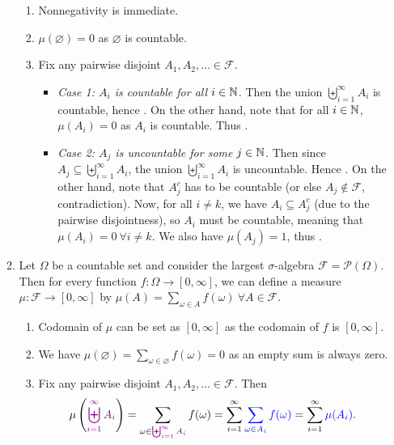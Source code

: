 \begin{enumerate}
\begin{enumerate}
\begin{pf}
\begin{enumerate}[label={(\arabic*)}]
\item Nonnegativity is immediate.
\item \(\mu(\varnothing)=0\) as \(\varnothing\) is countable.
\item Fix any pairwise disjoint \(A_1,A_2,\dotsc\in\mathcal{F}\).
\begin{itemize}
\item \emph{Case 1: \(A_i\) is countable for all \(i\in\mathbb{N}\).} Then the union
\(\biguplus_{i=1}^{\infty}A_i\) is countable, hence
. On the other hand, note that for all
\(i\in\mathbb{N}\), \(\mu(A_i)=0\) as \(A_i\) is countable. Thus
.
\item \emph{Case 2: \(A_j\) is uncountable for some \(j\in\mathbb{N}\).} Then since
\(A_j\subseteq \biguplus_{i=1}^{\infty}A_i\), the union
\(\biguplus_{i=1}^{\infty}A_i\) is uncountable. Hence
. On the other hand, note that \(A_j^c\)
has to be countable (or else \(A_j\notin\mathcal{F}\), contradiction). Now, for
all \(i\ne k\), we have \(A_i\subseteq A_j^c\) (due to the pairwise
disjointness), so \(A_i\) must be countable, meaning that \(\mu(A_i)=0~\forall
i\ne k\). We also have \(\mu(A_j)=1\), thus
.
\end{itemize}
\end{enumerate}
\end{pf}
\item\label{it:meas-sum-fn} Let \(\Omega\) be a countable set and consider the largest
\(\sigma\)-algebra \(\mathcal{F}=\mathcal{P}(\Omega)\). Then for every
function \(f:\Omega\to[0,\infty]\), we can define a measure
\(\mu:\mathcal{F}\to[0,\infty]\) by \(\mu(A)=\sum_{\omega\in
A}^{}f(\omega)~\forall A\in\mathcal{F}\).

\begin{pf}
\begin{enumerate}[label={(\arabic*)}]
\item Codomain of \(\mu\) can be set as \([0,\infty]\) as the codomain of
\(f\) is \([0,\infty]\).
\item We have \(\mu(\varnothing)=\sum_{\omega\in\varnothing}^{}f(\omega)=0\) as an empty sum is always zero.
\item Fix any pairwise disjoint \(A_1,A_2,\dotsc\in\mathcal{F}\). Then
\[
\mu\left({\color{violet}\biguplus_{i=1}^{\infty}A_i}\right)
=\sum_{\omega\in{\color{violet}\biguplus_{i=1}^{\infty}A_i}}^{}f(\omega)
=\sum_{i=1}^{\infty}{\color{blue}\sum_{\omega\in A_i}^{}f(\omega)}
=\sum_{i=1}^{\infty}{\color{blue}\mu(A_i)}.
\]
\end{enumerate}
\end{pf}


\end{enumerate}
\end{enumerate}
